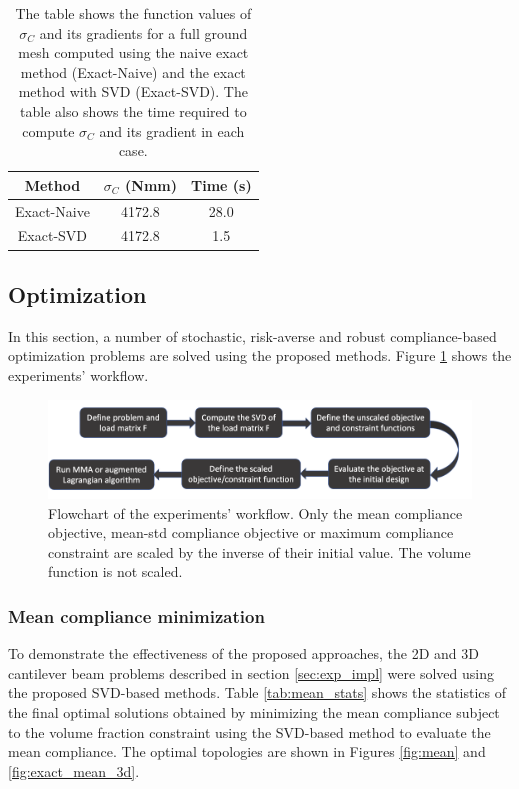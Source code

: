     \begin{table}[h!]
     \centering
     \caption{The table shows the function values of $\sigma_C$ and its gradients for a full ground mesh computed using the naive exact method (Exact-Naive) and the exact method with SVD (Exact-SVD). The table also shows the time required to compute $\sigma_C$ and its gradient in each case.}
     \begin{tabular}{|c|c|c|}
      \hline
      Method & $\sigma_C$ (Nmm) & Time (s) \\
      \hline
      \hline
      Exact-Naive & 4172.8 & 28.0 \\
      \hline
      Exact-SVD & 4172.8 & 1.5 \\
      \hline
     \end{tabular}
     \label{tab:time_std}
    \end{table}

  \subsection{Optimization}

    In this section, a number of stochastic, risk-averse and robust compliance-based optimization problems are solved using the proposed methods. Figure \ref{fig:flowchart} shows the experiments' workflow.

    \begin{figure}
      \centering
      \includegraphics[width=\textwidth]{./images/robust_exact/flowchart.png}
      \caption{Flowchart of the experiments' workflow. Only the mean compliance objective, mean-std compliance objective or maximum compliance constraint are scaled by the inverse of their initial value. The volume function is not scaled.}
      \label{fig:flowchart}
    \end{figure}

    \subsubsection{Mean compliance minimization}

      To demonstrate the effectiveness of the proposed approaches, the 2D and 3D cantilever beam problems described in section \ref{sec:exp_impl} were solved using the proposed SVD-based methods. Table \ref{tab:mean_stats} shows the statistics of the final optimal solutions obtained by minimizing the mean compliance subject to the volume fraction constraint using the SVD-based method to evaluate the mean compliance. The optimal topologies are shown in Figures \ref{fig:mean} and \ref{fig:exact_mean_3d}.

